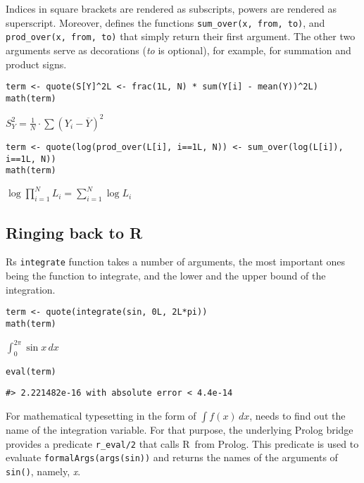 Indices in square brackets are rendered as subscripts, powers are rendered as
superscript. Moreover,  defines the
functions \texttt{sum\_over(x,\ from,\ to)}, and \texttt{prod\_over(x,\ from,\ to)} that simply
return their first argument. The other two arguments serve as
decorations (\emph{to} is optional), for example, for summation and product signs.

\begin{verbatim}
term <- quote(S[Y]^2L <- frac(1L, N) * sum(Y[i] - mean(Y))^2L)
math(term)
\end{verbatim}

\({{S}_{Y}^{2}}{=}{{\frac{1}{N}}{\cdot}{{\sum{\left({{Y}_{i}}{-}{\overline{Y}}\right)}}^{2}}}\)

\begin{verbatim}
term <- quote(log(prod_over(L[i], i==1L, N)) <- sum_over(log(L[i]), i==1L, N))
math(term)
\end{verbatim}

\({\log{{\prod}_{{i}{=}{1}}^{N}{{L}_{i}}}}{=}{{\sum}_{{i}{=}{1}}^{N}{\log{{L}_{i}}}}\)

\hypertarget{ringing-back-to-r}{%
\subsection{Ringing back to R}\label{ringing-back-to-r}}

R\textquotesingle s \texttt{integrate} function takes a number of arguments, the most important ones
being the function to integrate, and the lower and the upper bound of the
integration.

\begin{verbatim}
term <- quote(integrate(sin, 0L, 2L*pi))
math(term)
\end{verbatim}

\(\int_{0}^{{2}{{}}{\pi}}{\sin{x}}\,{d{x}}\)

\begin{verbatim}
eval(term)
\end{verbatim}

\begin{verbatim}
#> 2.221482e-16 with absolute error < 4.4e-14
\end{verbatim}

For mathematical typesetting in the form
of \(\int f(x)\, dx\),  needs to find out the name of the
integration variable. For that purpose, the underlying Prolog bridge provides a
predicate \texttt{r\_eval/2} that calls R~from Prolog. This predicate is used to
evaluate \texttt{formalArgs(args(sin))} and returns the names of the arguments
of \texttt{sin()}, namely, \emph{x}.

